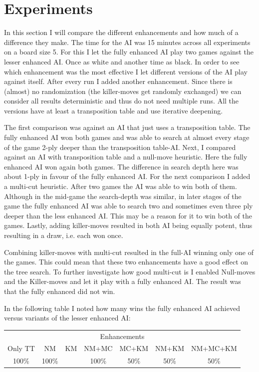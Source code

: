 \documentclass[a4paper]{article}
\begin{document}
\section{Experiments}
In this section I will compare the different enhancements and how much of a difference they make. The time for the AI was 15 minutes across all experiments on a board size 5. For this I let the fully enhanced AI play two games against the lesser enhanced AI. Once as white and another time as black.
In order to see which enhancement was the most effective I let different versions of the AI play against itself. After every run I added another enhancement. Since there is (almost) no randomization (the killer-moves get randomly exchanged) we can consider all results deterministic and thus do not need multiple runs. All the versions have at least a transposition table and use iterative deepening.

The first comparison was against an AI that just uses a transposition table. The fully enhanced AI won both games and was able to search at almost every stage of the game 2-ply deeper than the transposition table-AI.
Next, I compared against an AI with transposition table and a null-move heuristic. Here the fully enhanced AI won again both games. The difference in search depth here was about 1-ply in favour of the fully enhanced AI.
For the next comparison I added a multi-cut heuristic. After two games the AI was able to win both of them. Although in the mid-game the search-depth was similar, in later stages of the game the fully enhanced AI was able to search two and sometimes even three ply deeper than the less enhanced AI. This may be a reason for it to win both of the games.
Lastly, adding killer-moves resulted in both AI being equally potent, thus resulting in a draw, i.e. each won once.

Combining killer-moves with multi-cut resulted in the full-AI winning only one of the games. This could mean that these two enhancements have a good effect on the tree search. To further investigate how good multi-cut is I enabled Null-moves and the Killer-moves and let it play with a fully enhanced AI. The result was that the fully enhanced did not win.

In the following table I noted how many wins the fully enhanced AI achieved versus variants of the lesser enhanced AI: \\
\begin{tabular}{c|c|c|c|c|c|c}
	\multicolumn{7}{c}{Enhancements} \\
	Only TT & NM & KM & NM+MC & MC+KM & NM+KM & NM+MC+KM \\
	\hline
	100\% & 100\% &  & 100\% & 50\% & 50\% & 50\%

\end{tabular}



\end{document}
